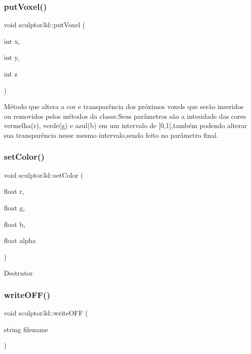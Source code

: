 \subsubsection{\texorpdfstring{put\+Voxel()}{putVoxel()}}
{\footnotesize\ttfamily void sculptor3d\+::put\+Voxel (\begin{DoxyParamCaption}\item[{int}]{x,  }\item[{int}]{y,  }\item[{int}]{z }\end{DoxyParamCaption})}

Método que altera a cor e transparência dos próximos voxels que serão inseridos ou removidos pelos métodos da classe.\+Seus parâmetros são a intesidade das cores vermelha(r), verde(g) e azul(b) em um intervalo de \mbox{[}0,1\mbox{]},também podendo alterar sua transparência nesse mesmo intervalo,sendo feito no parâmetro final. \mbox{\label{classsculptor3d_aba9db4181e1087a09f1de6eee3d03705}} 
\subsubsection{\texorpdfstring{set\+Color()}{setColor()}}
{\footnotesize\ttfamily void sculptor3d\+::set\+Color (\begin{DoxyParamCaption}\item[{float}]{r,  }\item[{float}]{g,  }\item[{float}]{b,  }\item[{float}]{alpha }\end{DoxyParamCaption})}

Destrutor. \mbox{\label{classsculptor3d_a7d9b24f6775441135936b184bb4079e0}} 
\subsubsection{\texorpdfstring{write\+O\+F\+F()}{writeOFF()}}
{\footnotesize\ttfamily void sculptor3d\+::write\+O\+FF (\begin{DoxyParamCaption}\item[{string}]{filename }\end{DoxyParamCaption})}

